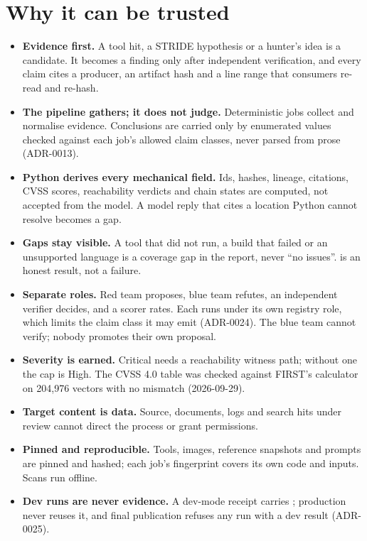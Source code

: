 \documentclass[10pt,a4paper]{article}
\begin{document}
\section{Why it can be trusted}
\begin{itemize}
\item \textbf{Evidence first.} A tool hit, a STRIDE hypothesis or a hunter's idea is a candidate. It
becomes a finding only after independent verification, and every claim cites a producer, an
artifact hash and a line range that consumers re-read and re-hash.
\item \textbf{The pipeline gathers; it does not judge.} Deterministic jobs collect and normalise
evidence. Conclusions are carried only by enumerated values checked against each job's allowed claim
classes, never parsed from prose (ADR-0013).
\item \textbf{Python derives every mechanical field.} Ids, hashes, lineage, citations, CVSS scores,
reachability verdicts and chain states are computed, not accepted from the model. A model reply that
cites a location Python cannot resolve becomes a gap.
\item \textbf{Gaps stay visible.} A tool that did not run, a build that failed or an unsupported
language is a coverage gap in the report, never ``no issues''.  is an honest
result, not a failure.
\item \textbf{Separate roles.} Red team proposes, blue team refutes, an independent verifier decides,
and a scorer rates. Each runs under its own registry role, which limits the claim class it may emit
(ADR-0024). The blue team cannot verify; nobody promotes their own proposal.
\item \textbf{Severity is earned.} Critical needs a reachability witness path; without one the cap is
High. The CVSS 4.0 table was checked against FIRST's calculator on 204,976 vectors with no mismatch
(2026-09-29).
\item \textbf{Target content is data.} Source, documents, logs and search hits under review cannot
direct the process or grant permissions.
\item \textbf{Pinned and reproducible.} Tools, images, reference snapshots and prompts are pinned and
hashed; each job's fingerprint covers its own code and inputs. Scans run offline.
\item \textbf{Dev runs are never evidence.} A dev-mode receipt carries ;
production never reuses it, and final publication refuses any run with a dev result (ADR-0025).
\end{itemize}
\end{document}
